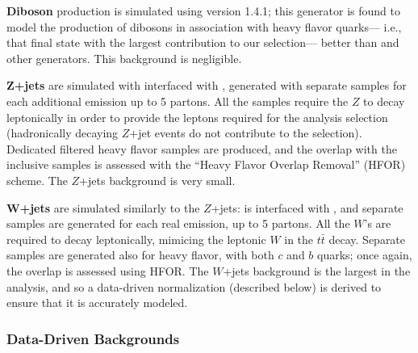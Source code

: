 \textbf{Diboson} production is simulated using \Sherpa version 1.4.1; this generator is found to model the production of dibosons in association with heavy flavor quarks--- i.e., that final state with the largest contribution to our selection--- better than \Herwigpp and other generators. This background is negligible.

\textbf{$\mathbf{Z}$+jets} are simulated with \Alpgen interfaced with \Pythia, generated with separate samples for each additional emission up to 5 partons. All the samples require the $Z$ to decay leptonically in order to provide the leptons required for the analysis selection (hadronically decaying $Z$+jet events do not contribute to the selection). Dedicated filtered heavy flavor samples are produced, and the overlap with the inclusive samples is assessed with the ``Heavy Flavor Overlap Removal'' (HFOR) scheme. The $Z$+jets background is very small.

\textbf{$\mathbf{W}$+jets} are simulated similarly to the $Z$+jets: \Alpgen is interfaced with \Pythia, and separate samples are generated for each real emission, up to 5 partons. All the $W$'s are required to decay leptonically, mimicing the leptonic $W$ in the $t\bar{t}$ decay. Separate samples are generated also for heavy flavor, with both $c$ and $b$ quarks; once again, the overlap is assessed using HFOR. The $W$+jets background is the largest in the analysis, and so a data-driven normalization (described below) is derived to ensure that it is accurately modeled. 


\subsubsection{Data-Driven Backgrounds}

